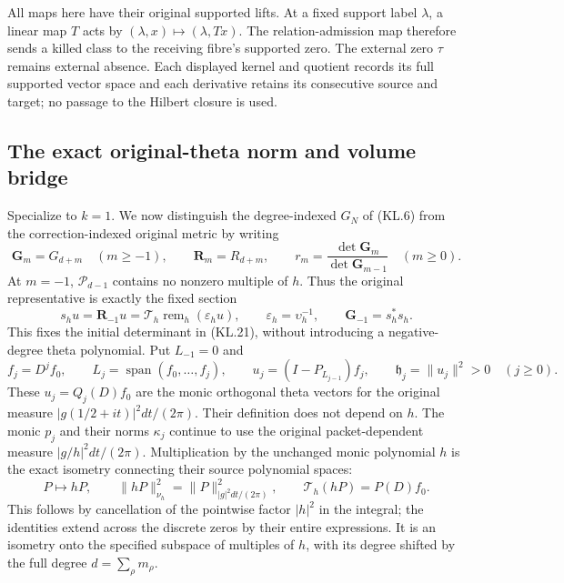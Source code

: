 All maps here have their original supported lifts.  At a fixed
support label \(\lambda\), a linear map \(T\) acts by
\((\lambda,x)\mapsto(\lambda,Tx)\).  The relation-admission
map therefore sends a killed class to the receiving fibre's
supported zero.  The external zero \(\tau\) remains external
absence.  Each displayed kernel and quotient records its full
supported vector space and each derivative retains its consecutive
source and target; no passage to the Hilbert closure is used.

\subsection{The exact original-theta norm and volume bridge}

Specialize to \(k=1\).  We now distinguish the degree-indexed
\(G_N\) of (KL.6) from the correction-indexed original metric by
writing
\[
 \mathbf G_m=G_{d+m}\quad(m\geq-1),\qquad
 \mathbf R_m=R_{d+m},\qquad
 r_m=\frac{\det\mathbf G_m}{\det\mathbf G_{m-1}}
       \quad(m\geq0).
                                                               \tag{KL.21}
\]
At \(m=-1\), \(\mathcal P_{d-1}\) contains no nonzero
multiple of \(h\).  Thus the original representative is exactly
the fixed section
\[
 s_hu=\mathbf R_{-1}u
   =\mathcal T_h\operatorname{rem}_h(\varepsilon_hu),
 \qquad \varepsilon_h=\upsilon_h^{-1},
 \qquad \mathbf G_{-1}=s_h^*s_h.
\]
This fixes the initial determinant in (KL.21), without introducing
a negative-degree theta polynomial.  Put \(L_{-1}=0\) and
\[
 f_j=D^jf_0,\qquad L_j=\operatorname{span}(f_0,\ldots,f_j),
 \qquad u_j=(I-P_{L_{j-1}})f_j,
 \qquad \mathfrak h_j=\|u_j\|^2>0\quad(j\geq0).
                                                               \tag{KL.22}
\]
These \(u_j=Q_j(D)f_0\) are the monic orthogonal theta
vectors for the original measure
\(|g(1/2+it)|^2dt/(2\pi)\).  Their definition does not depend
on \(h\).  The monic \(p_j\) and their norms \(\kappa_j\)
continue to use the original packet-dependent measure
\(|g/h|^2dt/(2\pi)\).  Multiplication by the unchanged monic
polynomial \(h\) is the exact isometry connecting their source
polynomial spaces:
\[
 P\longmapsto hP,\qquad
 \|hP\|_{\nu_h}^2=\|P\|_{|g|^2dt/(2\pi)}^2,
 \qquad \mathcal T_h(hP)=P(D)f_0.
                                                               \tag{KL.23}
\]
This follows by cancellation of the pointwise factor \(|h|^2\)
in the integral; the identities extend across the discrete zeros by
their entire expressions.  It is an isometry onto the specified
subspace of multiples of \(h\), with its degree shifted by the
full degree \(d=\sum_\rho m_\rho\).

